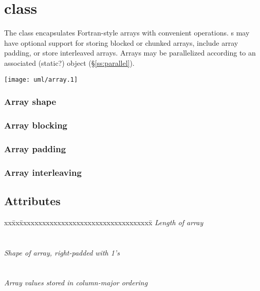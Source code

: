 \documentclass{book}
\begin{document}
\section{ class}

The  class encapsulates Fortran-style arrays with
convenient operations.  s may have optional support for
storing blocked or chunked arrays, include array padding, or store
interleaved arrays.  Arrays may be parallelized according to an
associated (static?)  object (\S\ref{ss:parallel}).



\centerline{\texttt{[image: uml/array.1]}}

\subsubsection{Array shape}

\subsubsection{Array blocking}

\subsubsection{Array padding}

\subsubsection{Array interleaving}


\subsection{Attributes}

\begin{tabbing}
xx\=xx\=xxxxxxxxxxxxxxxxxxxxxxxxxxxxxxxxxxx\= \kill
\> \todo \>  \textit{Length of array} \\
\>       \>       \\ \\
\> \todo \>  \textit {Shape of array, right-padded with 1's} \\
\>       \>   \\ \\
\> \todo \>  \textit {Array values stored in column-major ordering}\\
\>       \> 
\end{tabbing}
\end{document}
